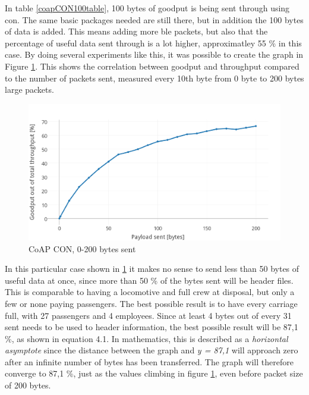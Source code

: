 \noindent In table \ref{coapCON100table}, 100 bytes of goodput is being sent through using \gls{con}. The same basic packages needed are still there, but in addition the 100 bytes of data is added. This means adding more \gls{ble} packets, but also that the percentage of useful data sent through is a lot higher, approximatley 55 \% in this case. By doing several experiments like this, it was possible to create the graph in Figure \ref{fig:coapCON0200}. This shows the correlation between goodput and throughput compared to the number of packets sent, measured every 10th byte from 0 byte to 200 bytes large packets.


\begin{figure}[ht]
    \centering
    \includegraphics[scale=1.0]{CoAPCON_0-200_Thicker3.png}    
    \caption{CoAP CON, 0-200 bytes sent}
    \label{fig:coapCON0200}
\end{figure}



\noindent In this particular case shown in \ref{fig:coapCON0200} it makes no sense to send less than 50 bytes of useful data at once, since more than 50 \% of the bytes sent will be header files. This is comparable to having a locomotive and full crew at disposal, but only a few or none paying passengers. The best possible result is to have every carriage full, with 27 passengers and 4 employees. Since at least 4 bytes out of every 31 sent needs to be used to header information, the best possible result will be 87,1 \%, as shown in equation 4.1. In mathematics, this is described as a \textit{horizontal asymptote} since the distance between the graph and \textit{y = 87,1} will approach zero after an infinite number of bytes has been transferred. The graph will therefore converge to 87,1 \%, just as the values climbing in figure \ref{fig:coapCON0200}, even before packet size of 200 bytes.  

